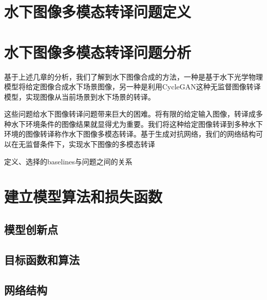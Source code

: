 \section{水下图像多模态转译问题定义}



\section{水下图像多模态转译问题分析}


基于上述几章的分析，我们了解到水下图像合成的方法，一种是基于水下光学物理模型将给定图像合成水下场景图像，另一种是利用CycleGAN这种无监督图像转译模型，实现图像从当前场景到水下场景的转译。

这些问题给水下图像转译问题带来巨大的困难。将有限的给定输入图像，转译成多种水下环境条件的图像结果就显得尤为重要。我们将这种给定图像转译到多种水下环境的图像转译称作水下图像多模态转译。基于生成对抗网络，我们的网络结构可以在无监督条件下，实现水下图像的多模态转译

定义、选择的baselines与问题之间的关系
\section{建立模型算法和损失函数}
\subsection{模型创新点}
\subsection{目标函数和算法}
\subsection{网络结构}

